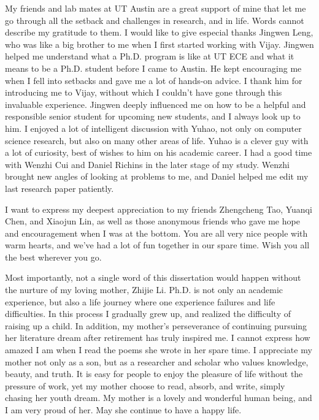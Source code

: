 \begin{acknowledgments}
My friends and lab mates at UT Austin are a great support of mine that let me go through all the setback and challenges in research, and in life. Words cannot describe my gratitude to them. I would like to give especial thanks Jingwen Leng, who was like a big brother to me when I first started working with Vijay. Jingwen helped me understand what a Ph.D. program is like at UT ECE and what it means to be a Ph.D. student before I came to Austin. He kept encouraging me when I fell into setbacks and gave me a lot of hands-on advice. I thank him for introducing me to Vijay, without which I couldn't have gone through this invaluable experience. Jingwen deeply influenced me on how to be a helpful and responsible senior student for upcoming new students, and I always look up to him. I enjoyed a lot of intelligent discussion with Yuhao, not only on computer science research, but also on many other areas of life. Yuhao is a clever guy with a lot of curiosity, best of wishes to him on his academic career. I had a good time with Wenzhi Cui and Daniel Richins in the later stage of my study. Wenzhi brought new angles of looking at problems to me, and Daniel helped me edit my last research paper patiently.

I want to express my deepest appreciation to my friends Zhengcheng Tao, Yuanqi Chen, and Xiaojun Lin, as well as those anonymous friends who gave me hope and encouragement when I was at the bottom. You are all very nice people with warm hearts, and we've had a lot of fun together in our spare time. Wish you all the best wherever you go.

Most importantly, not a single word of this dissertation would happen without the nurture of my loving mother, Zhijie Li. Ph.D. is not only an academic experience, but also a life journey where one experience failures and life difficulties. In this process I gradually grew up, and realized the difficulty of raising up a child. In addition, my mother's perseverance of continuing pursuing her literature dream after retirement has truly inspired me. I cannot express how amazed I am when I read the poems she wrote in her spare time. I appreciate my mother not only as a son, but as a researcher and scholar who values knowledge, beauty, and truth. It is easy for people to enjoy the pleasure of life without the pressure of work, yet my mother choose to read, absorb, and write, simply chasing her youth dream. My mother is a lovely and wonderful human being, and I am very proud of her. May she continue to have a happy life.


\end{acknowledgments}
